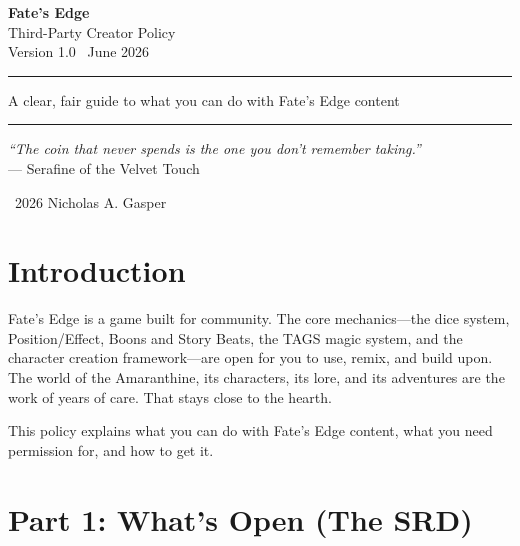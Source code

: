 \documentclass[11pt]{article}
\begin{document}
\begin{titlepage}
  \centering
  \vspace*{2in}

  {\Huge\bfseries\color{gold} Fate's Edge}\\[0.2in]
  {\Large Third-Party Creator Policy}\\[0.1in]
  {\large Version 1.0 \textbullet\ June 2026}

  \vspace{1in}

  \rule{0.6\textwidth}{0.4pt}

  \vspace{0.5in}

  {\large A clear, fair guide to what you can do with Fate's Edge content}

  \vspace{0.5in}

  \rule{0.6\textwidth}{0.4pt}

  \vspace{1in}

  {\small \textcolor{textmuted}{
    \textit{``The coin that never spends is the one you don't remember taking.''}\\
    --- Serafine of the Velvet Touch
  }}

  \vfill

  {\small \textcolor{textmuted}{\textcopyright\ 2026 Nicholas A. Gasper}}
\end{titlepage}

\section*{Introduction}

Fate's Edge is a game built for community. The core mechanics---the dice system, Position/Effect, Boons and Story Beats, the TAGS magic system, and the character creation framework---are open for you to use, remix, and build upon. The world of the Amaranthine, its characters, its lore, and its adventures are the work of years of care. That stays close to the hearth.

This policy explains what you can do with Fate's Edge content, what you need permission for, and how to get it.

\section*{Part 1: What's Open (The SRD)}
\end{document}
